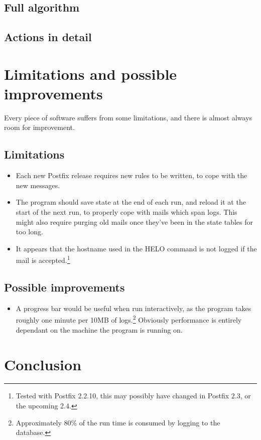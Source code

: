 \documentclass[a4paper,12pt,draft]{article}
\begin{document}
\subsection{Full algorithm}

\label{full-algorithm}


\subsection{Actions in detail}

\label{actions-in-detail}


\section{Limitations and possible improvements}

Every piece of software suffers from some limitations, and there is almost
always room for improvement.

\subsection{Limitations}

\begin{itemize}

    \item Each new Postfix release requires new rules to be written, to
        cope with the new messages.

    \item The program should save state at the end of each run, and reload
        it at the start of the next run, to properly cope with mails which
        span logs.  This might also require purging old mails once they've
        been in the state tables for too long.

    \item It appears that the hostname used in the HELO command is not
        logged if the mail is accepted.\footnote{Tested with Postfix
        2.2.10, this may possibly have changed in Postfix 2.3, or the
        upcoming 2.4.}

\end{itemize}

\subsection{Possible improvements}
\begin{itemize}

    \item A progress bar would be useful when run interactively, as the
        program takes roughly one minute per 10MB of
        logs.\footnote{Approximately 80\% of the run time is consumed by
        logging to the database.}  Obviously performance is entirely
        dependant on the machine the program is running on.

\end{itemize}

\section{Conclusion}

\appendix
\end{document}
